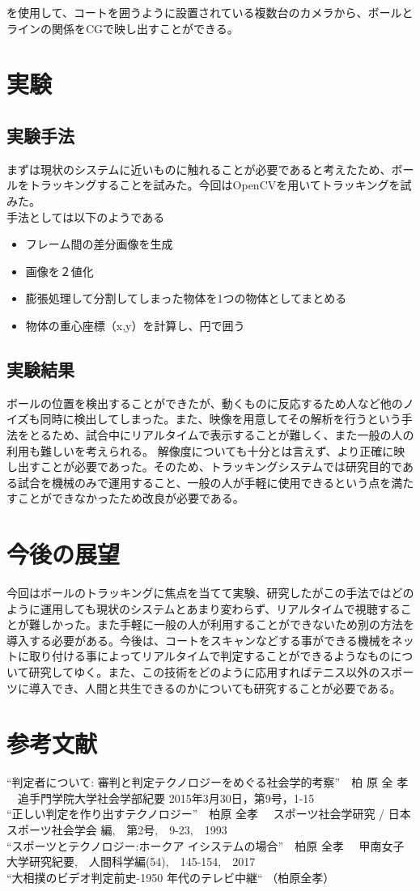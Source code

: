 \documentclass[a4j,10pt]{jsarticle}
\begin{document}
を使用して、コートを囲うように設置されている複数台のカメラから、ボールとラインの関係をCGで映し出すことができる。

\section{実験}
\subsection{実験手法}
まずは現状のシステムに近いものに触れることが必要であると考えたため、ボールをトラッキングすることを試みた。今回はOpenCVを用いてトラッキングを試みた。
\\手法としては以下のようである
\begin{itemize}
\item フレーム間の差分画像を生成
\item 画像を２値化
\item 膨張処理して分割してしまった物体を1つの物体としてまとめる
\item 物体の重心座標（x,y）を計算し、円で囲う
\end{itemize}

\subsection{実験結果}
ボールの位置を検出することができたが、動くものに反応するため人など他のノイズも同時に検出してしまった。また、映像を用意してその解析を行うという手法をとるため、試合中にリアルタイムで表示することが難しく、また一般の人の利用も難しいを考えられる。
解像度についても十分とは言えず、より正確に映し出すことが必要であった。そのため、トラッキングシステムでは研究目的である試合を機械のみで運用すること、一般の人が手軽に使用できるという点を満たすことができなかったため改良が必要である。



\section{今後の展望}
今回はボールのトラッキングに焦点を当てて実験、研究したがこの手法ではどのように運用しても現状のシステムとあまり変わらず、リアルタイムで視聴することが難しかった。また手軽に一般の人が利用することができないため別の方法を導入する必要がある。今後は、コートをスキャンなどする事ができる機械をネットに取り付ける事によってリアルタイムで判定することができるようなものについて研究してゆく。また、この技術をどのように応用すればテニス以外のスポーツに導入でき、人間と共生できるのかについても研究することが必要である。

\section{参考文献}
“判定者について: 審判と判定テクノロジーをめぐる社会学的考察”　柏 原 全 孝 
　追手門学院大学社会学部紀要 2015年3月30日，第9号，1-15 
\\“正しい判定を作り出すテクノロジー”　柏原 全孝 
　スポーツ社会学研究 / 日本スポーツ社会学会 編,　第2号,　9-23,　1993
\\“スポーツとテクノロジー:ホークア イシステムの場合”　柏原 全孝 
　甲南女子大学研究紀要,　人間科学編(54),　145-154,　2017 
\\“大相撲のビデオ判定前史-1950 年代のテレビ中継“ （柏原全孝）
\end{document}
